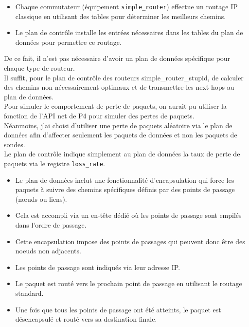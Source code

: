 \documentclass[12pt,a4paper]{report}
\begin{document}
        \begin{card}
            \begin{itemize}[left=0pt]
                \item Chaque commutateur (équipement \texttt{simple\_router}) effectue un routage IP classique en utilisant des tables pour déterminer les meilleurs chemins.
                \item Le plan de contrôle installe les entrées nécessaires dans les tables du plan de données pour permettre ce routage.
            \end{itemize}
        De ce fait, il n'est pas nécessaire d'avoir un plan de données spécifique pour chaque type de routeur. \\
        Il suffit, pour le plan de contrôle des routeurs simple\_router\_stupid, de calculer des chemins non nécessairement optimaux et de transmettre les next hops au plan de données. \\
        Pour simuler le comportement de perte de paquets, on aurait pu utiliser la fonction de l'API net de P4 pour simuler des pertes de paquets. \\
        Néanmoins, j'ai choisi d'utiliser une perte de paquets aléatoire via le plan de données afin d'affecter seulement les paquets de données et non les paquets de sondes. \\
        Le plan de contrôle indique simplement au plan de données la taux de perte de paquets via le registre \texttt{loss\_rate}.
        \end{card}

        \begin{card}
            \begin{itemize}[left=0pt]
                \item Le plan de données inclut une fonctionnalité d'encapsulation qui force les paquets à suivre des chemins spécifiques définis par des points de passage (nœuds ou liens).
                \item Cela est accompli via un en-tête dédié où les points de passage sont empilés dans l'ordre de passage.
                \item Cette encapsulation impose des points de passages qui peuvent donc être des noeuds non adjacents.
                \item Les points de passage sont indiqués via leur adresse IP.
                \item Le paquet est routé vers le prochain point de passage en utilisant le routage standard.
                \item Une fois que tous les points de passage ont été atteints, le paquet est désencapsulé et routé vers sa destination finale.
            \end{itemize}
        \end{card}
\end{document}
